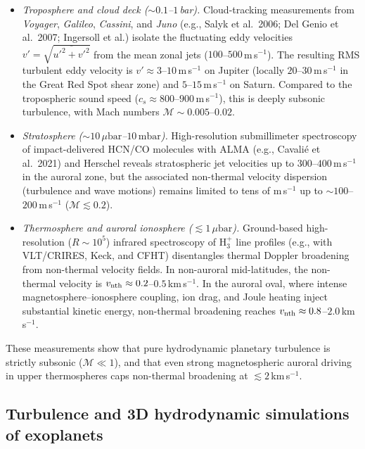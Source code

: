 \documentclass[english,a4paper]{my_memo}
\begin{document}
\begin{itemize}
\item \emph{Troposphere and cloud deck ($\sim 0.1$--$1$\,bar).}
      Cloud-tracking measurements from \textit{Voyager}, \textit{Galileo},
      \textit{Cassini}, and \textit{Juno} (e.g., Salyk et al.\ 2006; Del
      Genio et al.\ 2007; Ingersoll et al.) isolate the fluctuating eddy
      velocities $v' = \sqrt{\overline{u'^2 + v'^2}}$ from the mean zonal
      jets ($100$--$500$\,m\,s$^{-1}$). The resulting RMS turbulent eddy
      velocity is $v' \approx 3$--$10$\,m\,s$^{-1}$ on Jupiter (locally
      $20$--$30$\,m\,s$^{-1}$ in the Great Red Spot shear zone) and
      $5$--$15$\,m\,s$^{-1}$ on Saturn. Compared to the tropospheric sound
      speed ($c_s \approx 800$--$900$\,m\,s$^{-1}$), this is deeply subsonic
      turbulence, with Mach numbers $\mathcal{M} \sim 0.005$--$0.02$.
\item \emph{Stratosphere ($\sim 10\,\mu\mathrm{bar}$--$10\,\mathrm{mbar}$).}
      High-resolution submillimeter spectroscopy of impact-delivered HCN/CO
      molecules with ALMA (e.g., Cavali\'e et al.\ 2021) and Herschel reveals
      stratospheric jet velocities up to $300$--$400$\,m\,s$^{-1}$ in the
      auroral zone, but the associated non-thermal velocity dispersion
      (turbulence and wave motions) remains limited to tens of m\,s$^{-1}$
      up to $\sim 100$--$200$\,m\,s$^{-1}$ ($\mathcal{M} \lesssim 0.2$).
\item \emph{Thermosphere and auroral ionosphere ($\lesssim 1\,\mu\mathrm{bar}$).}
      Ground-based high-resolution ($R \sim 10^5$) infrared spectroscopy of
      $\mathrm{H}_3^+$ line profiles (e.g., with VLT/CRIRES, Keck, and CFHT)
      disentangles thermal Doppler broadening from non-thermal velocity
      fields. In non-auroral mid-latitudes, the non-thermal velocity is
      $v_{\rm nth} \approx 0.2$--$0.5$\,km\,s$^{-1}$. In the auroral oval,
      where intense magnetosphere--ionosphere coupling, ion drag, and Joule
      heating inject substantial kinetic energy, non-thermal broadening
      reaches $v_{\rm nth} \approx 0.8$--$2.0$\,km\,s$^{-1}$.
\end{itemize}

\noindent These measurements show that pure hydrodynamic planetary
turbulence is strictly subsonic ($\mathcal{M} \ll 1$), and that even strong
magnetospheric auroral driving in upper thermospheres caps non-thermal
broadening at $\lesssim 2$\,km\,s$^{-1}$.

\subsection{Turbulence and 3D hydrodynamic simulations of exoplanets}
\label{sec:3d_turb}
\end{document}
